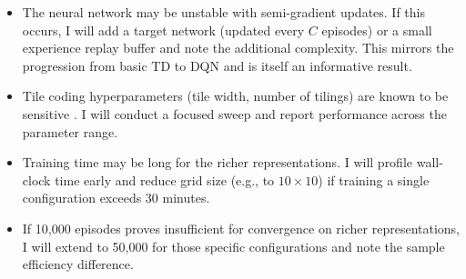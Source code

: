 \documentclass[11pt]{article}
\begin{document}
\begin{itemize}
    \item The neural network may be unstable with semi-gradient updates. If this occurs, I will add a target network (updated every $C$ episodes) or a small experience replay buffer and note the additional complexity. This mirrors the progression from basic TD to DQN \citep{mnih2015dqn} and is itself an informative result.
    \item Tile coding hyperparameters (tile width, number of tilings) are known to be sensitive \citep{sherstov2005tilecoding}. I will conduct a focused sweep and report performance across the parameter range.
    \item Training time may be long for the richer representations. I will profile wall-clock time early and reduce grid size (e.g., to $10 \times 10$) if training a single configuration exceeds 30 minutes.
    \item If 10,000 episodes proves insufficient for convergence on richer representations, I will extend to 50,000 for those specific configurations and note the sample efficiency difference.
\end{itemize}
\end{document}
